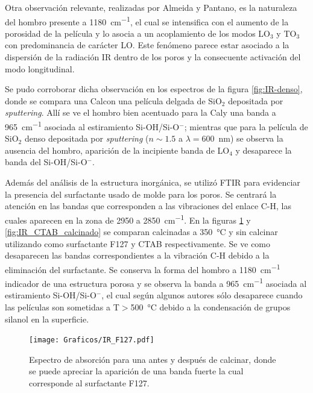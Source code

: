 		 \pagebreak Otra observación relevante, realizadas por Almeida y Pantano\cite{Almeida1990}, es la naturaleza del hombro presente a \SI{1180}{\cm^{-1}}, el cual se intensifica con el aumento de la porosidad de la película y lo asocia a un acoplamiento de los modos LO$_3$ y TO$_3$ con predominancia de carácter LO. Este fenómeno parece estar asociado a la dispersión de la radiación IR dentro de los poros y la consecuente activación del modo longitudinal.	
			
		 Se pudo corroborar dicha observación en los espectros de la figura \ref{fig:IR-denso}, donde se compara una Cal\pdm\space con una película delgada de SiO$_2$ depositada por \textit{sputtering}. Allí se ve el hombro bien acentuado para la Cal\pdmF\space y una banda a \SI{965}{\cm^{-1}} asociada al estiramiento Si-OH/Si-O$^-$; mientras que para la película de SiO$_2$ denso depositada por \textit{sputtering} ($n\sim 1.5$ a $\lambda=$\SI{600}{\nm})\cite{Vergohl1999} se observa la ausencia del hombro, aparición de la incipiente banda de LO$_4$ y desaparece la banda del Si-OH/Si-O$^-$.

		 Además del análisis de la estructura inorgánica, se utilizó FTIR para evidenciar la presencia del surfactante usado de molde para los poros. Se centrará la atención en las bandas que corresponden a las vibraciones del enlace C-H, las cuales aparecen en la zona de 2950 a \SI{2850}{\cm^{-1}}. En la figuras \ref{fig:IR_F127_calciando} y \ref{fig:IR_CTAB_calcinado} se comparan \pdm\space calcinadas a \SI{350}{\celsius} y sin calcinar utilizando como surfactante F127 y CTAB respectivamente. Se ve como desaparecen las bandas correspondientes a la vibración C-H debido a la eliminación del surfactante. Se conserva la forma del hombro a \SI{1180}{\cm^{-1}} indicador de una estructura porosa y se observa la banda a \SI{965}{\cm^{-1}} asociada al estiramiento Si-OH/Si-O$^-$, el cual según algunos autores sólo desaparece cuando las películas son sometidas a T$>$\SI{500}{\celsius} debido a la condensación de grupos silanol en la superficie.\cite{Innocenzi2003,Almeida1990,Bertoluzza1982}

				\begin{figure}[b!]
						\begin{center}
						\texttt{[image: Graficos/IR\_F127.pdf]}
						\caption[FTIR para una \pdmF.]{Espectro de absorción para una \pdmF\space antes y después de calcinar, donde se puede apreciar la aparición de una banda fuerte la cual corresponde al surfactante F127.}
						\label{fig:IR_F127_calciando}
						\end{center}
						\end{figure}
			 
